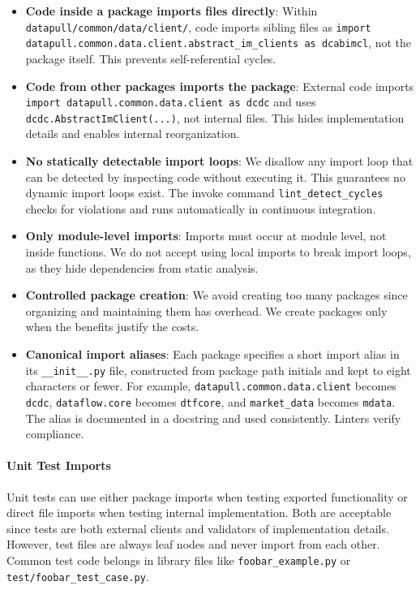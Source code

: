 \begin{itemize}
  \item \textbf{Code inside a package imports files directly}: Within
    \texttt{datapull/common/data/client/}, code imports sibling files
    as \texttt{import datapull.common.data.client.abstract\_im\_clients
    as dcabimcl}, not the package itself. This prevents self-referential
    cycles.

  \item \textbf{Code from other packages imports the package}: External
    code imports \texttt{import datapull.common.data.client as dcdc}
    and uses \texttt{dcdc.AbstractImClient(...)}, not internal files.
    This hides implementation details and enables internal reorganization.

  \item \textbf{No statically detectable import loops}: We disallow
    any import loop that can be detected by inspecting code without
    executing it. This guarantees no dynamic import loops exist. The
    invoke command \texttt{lint\_detect\_cycles} checks for violations
    and runs automatically in continuous integration.

  \item \textbf{Only module-level imports}: Imports must occur at module
    level, not inside functions. We do not accept using local imports
    to break import loops, as they hide dependencies from static analysis.

  \item \textbf{Controlled package creation}: We avoid creating too
    many packages since organizing and maintaining them has overhead.
    We create packages only when the benefits justify the costs.

  \item \textbf{Canonical import aliases}: Each package specifies a
    short import alias in its \texttt{\_\_init\_\_.py} file, constructed
    from package path initials and kept to eight characters or fewer.
    For example, \texttt{datapull.common.data.client} becomes
    \texttt{dcdc}, \texttt{dataflow.core} becomes \texttt{dtfcore},
    and \texttt{market\_data} becomes \texttt{mdata}. The alias is
    documented in a docstring and used consistently. Linters verify
    compliance.
\end{itemize}

\paragraph{Unit Test Imports}
Unit tests can use either package imports when testing exported functionality
or direct file imports when testing internal implementation. Both are
acceptable since tests are both external clients and validators of
implementation details. However, test files are always leaf nodes and
never import from each other. Common test code belongs in library
files like \texttt{foobar\_example.py} or \texttt{test/foobar\_test\_case.py}.

